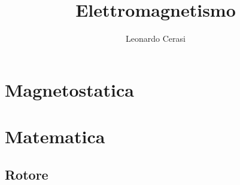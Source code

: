 \documentclass[]{article}
\title{\Huge Elettromagnetismo}
\author{Leonardo Cerasi}
\date{}
\begin{document}
\maketitle

\section{Magnetostatica}

\newpage

\section{Matematica}

\subsection{Rotore}


\end{document}
